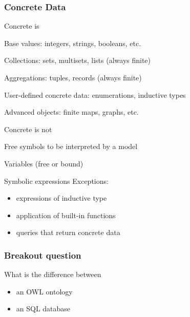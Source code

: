 \documentclass{beamer}
\begin{document}
\begin{frame}\frametitle{Concrete Data}
\begin{blockitems}{Concrete is}
\item Base values: integers, strings, booleans, etc.
\item Collections: sets, multisets, lists (always finite)
\item Aggregations: tuples, records (always finite)
\item User-defined concrete data: enumerations, inductive types
\item Advanced objects: finite maps, graphs, etc.
\end{blockitems}

\begin{blockitems}{Concrete is not}
\item Free symbols to be interpreted by a model
\item Variables (free or bound)
\item Symbolic expressions
 Exceptions:
  \begin{itemize}
  \item expressions of inductive type
  \item application of built-in functions
  \item queries that return concrete data
  \end{itemize}
\end{blockitems}
\end{frame}

\begin{frame}\frametitle{Breakout question}
What is the difference between
\begin{itemize}
\item an OWL ontology
\item an SQL database
\end{itemize}
\end{frame}
\end{document}
